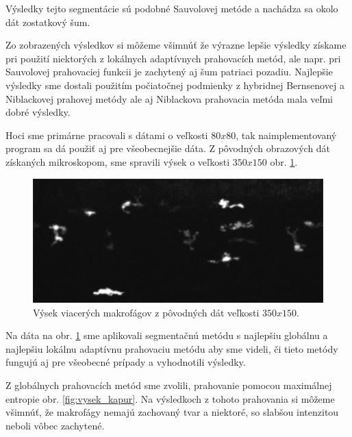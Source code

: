 \documentclass[a4paper,11pt,oneside]{article}%
\begin{document}
Výsledky tejto segmentácie sú podobné Sauvolovej metóde a nachádza sa okolo dát zostatkový šum.


Zo zobrazených výsledkov si môžeme všimnúť že výrazne lepšie výsledky získame pri použití niektorých z lokálnych adaptívnych prahovacích metód, ale napr. pri Sauvolovej prahovaciej funkcii je zachytený aj šum patriaci pozadiu. Najlepšie výsledky sme dostali použitím počiatočnej podmienky z hybridnej Bernsenovej a Niblackovej prahovej metódy ale aj Niblackova prahovacia metóda mala veľmi dobré výsledky. 

Hoci sme primárne pracovali s dátami o veľkosti $80x80$, tak naimplementovaný program sa dá použiť aj pre všeobecnejšie dáta. Z pôvodných obrazových dát získaných mikroskopom, sme spravili výsek o veľkosti $350x150$ obr. \ref{fig:vysek}.

\begin{figure}[H]
 \begin{center} 
 \includegraphics[scale=0.50]{pics/vysekoD.png}
\caption{Výsek viacerých makrofágov z pôvodných dát veľkosti $350x150$.}
\label{fig:vysek}
\end{center} 
\end{figure}

Na dáta na obr. \ref{fig:vysek} sme aplikovali segmentačnú metódu s najlepšiu globálnu a najlepšiu lokálnu adaptívnu prahovaciu metódu aby sme videli, či tieto metódy fungujú aj pre všeobecné prípady a vyhodnotili výsledky. 

Z globálnych prahovacích metód sme zvolili, prahovanie pomocou maximálnej entropie obr. \ref{fig:vysek_kapur}. Na výsledkoch z tohoto prahovania si môžeme všimnúť, že makrofágy nemajú zachovaný tvar a niektoré, so slabšou intenzitou neboli vôbec zachytené. 
\end{document}

